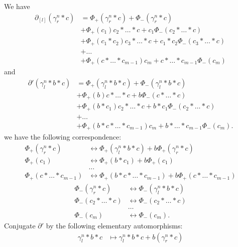 \documentclass[11pt]{amsart}
\makeatletter
\renewenvironment{proof}[1][\proofname] {\par\pushQED{\qed}{\normalfont\bfseries\topsep6\p@\@plus6\p@\relax #1\@addpunct{.} }}{\popQED\endtrivlist\@endpefalse}
\theoremstyle{mystyle}
\newcommand{\<}{\langle}
\renewcommand{\>}{\rangle}
\makeatother
\begin{document}
\begin{proof}
     We have \begin{align*}
        \partial_{[l]}(\gamma_r^n * c) &= \Phi_+(\gamma_r^n * c) + \Phi_-(\gamma_r^n * c) \\
        &+ \Phi_+(c_1) c_2 * \dots  * c + c_1 \Phi_-(c_2 * \dots  * c) \\
        &+ \Phi_+(c_1 * c_2) c_3 * \dots  * c + c_1 * c_2 \Phi_-(c_3 * \dots  * c) \\
        &+ \ldots \\
        &+ \Phi_+(c * \dots  * c_{m-1}) c_m + c * \dots  * c_{m-1} \Phi_-(c_m)
    \end{align*} and \begin{align*}
        \partial'(\gamma_l^n * b * c) &= \Phi_+(\gamma_l^n * b * c) + \Phi_-(\gamma_l^n * b * c) \\
        &+ \Phi_+(b) c * \dots  * c + b \Phi_-(c * \dots  * c) \\
        &+ \Phi_+(b * c_1) c_2 * \dots  * c + b * c_1 \Phi_-(c_2 * \dots  * c) \\
        &+ \ldots \\
        &+ \Phi_+(b * c * \dots  * c_{m-1}) c_m + b * \dots  * c_{m-1} \Phi_-(c_m).
    \end{align*} we have the following correspondence: \begin{align*}
        \Phi_+(\gamma_r^n * c) &\leftrightarrow \Phi_+(\gamma_l^n * b * c) + b\Phi_+(\gamma_r^n * c) \\
        \Phi_+(c_1) &\leftrightarrow \Phi_+(b * c_1) + b\Phi_+(c_1) \\
        &\dots \\
        \Phi_+(c * \dots * c_{m-1}) &\leftrightarrow \Phi_+(b * c * \dots * c_{m-1}) + b\Phi_+(c * \dots * c_{m-1})
    \end{align*} \begin{align*}
        \Phi_-(\gamma_r^n * c) &\leftrightarrow \Phi_-(\gamma_l^n * b * c) \\
        \Phi_-(c_2 * \dots * c) &\leftrightarrow \Phi_-(c_2 * \dots * c) \\
        &\dots \\
        \Phi_-(c_m) &\leftrightarrow \Phi_-(c_m).
    \end{align*} Conjugate $\partial'$ by the following elementary automorphisms: \begin{align*}
        \gamma_l^n * b * c &\mapsto \gamma_l^n * b * c + b (\gamma_r^n * c) \\

\end{align*}
\end{proof}
\end{document}

